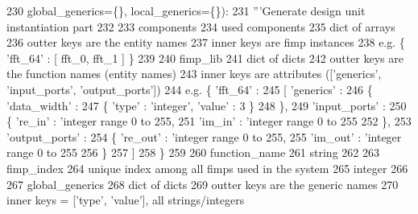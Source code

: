 \begin{DoxyCode}
230                         global\_generics=\{\}, local\_generics=\{\}):
231     \textcolor{stringliteral}{'''Generate design unit instantiation part}
232 \textcolor{stringliteral}{}
233 \textcolor{stringliteral}{      components}
234 \textcolor{stringliteral}{        used components}
235 \textcolor{stringliteral}{        dict of arrays}
236 \textcolor{stringliteral}{        outter keys are the entity names}
237 \textcolor{stringliteral}{        inner keys are fimp instances}
238 \textcolor{stringliteral}{        e.g. \{ 'fft\_64' : [ fft\_0, fft\_1 ] \}}
239 \textcolor{stringliteral}{}
240 \textcolor{stringliteral}{      fimp\_lib}
241 \textcolor{stringliteral}{        dict of dicts}
242 \textcolor{stringliteral}{        outter keys are the function names (entity names)}
243 \textcolor{stringliteral}{        inner keys are attributes (['generics', 'input\_ports', 'output\_ports'])}
244 \textcolor{stringliteral}{        e.g. \{ 'fft\_64' :}
245 \textcolor{stringliteral}{               [ 'generics' :}
246 \textcolor{stringliteral}{                 \{ 'data\_width' :}
247 \textcolor{stringliteral}{                   \{ 'type' : 'integer', 'value' : 3 \}}
248 \textcolor{stringliteral}{                 \},}
249 \textcolor{stringliteral}{                 'input\_ports' :}
250 \textcolor{stringliteral}{                 \{ 're\_in' : 'integer range 0 to 255,}
251 \textcolor{stringliteral}{                   'im\_in' : 'integer range 0 to 255}
252 \textcolor{stringliteral}{                 \},}
253 \textcolor{stringliteral}{                 'output\_ports' :}
254 \textcolor{stringliteral}{                 \{ 're\_out' : 'integer range 0 to 255,}
255 \textcolor{stringliteral}{                   'im\_out' : 'integer range 0 to 255}
256 \textcolor{stringliteral}{                 \}}
257 \textcolor{stringliteral}{               ]}
258 \textcolor{stringliteral}{             \}}
259 \textcolor{stringliteral}{}
260 \textcolor{stringliteral}{      function\_name}
261 \textcolor{stringliteral}{        string}
262 \textcolor{stringliteral}{}
263 \textcolor{stringliteral}{      fimp\_index}
264 \textcolor{stringliteral}{        unique index among all fimps used in the system}
265 \textcolor{stringliteral}{        integer}
266 \textcolor{stringliteral}{}
267 \textcolor{stringliteral}{      global\_generics}
268 \textcolor{stringliteral}{        dict of dicts}
269 \textcolor{stringliteral}{        outter keys are the generic names}
270 \textcolor{stringliteral}{        inner keys = ['type', 'value'], all strings/integers}

\end{DoxyCode}
